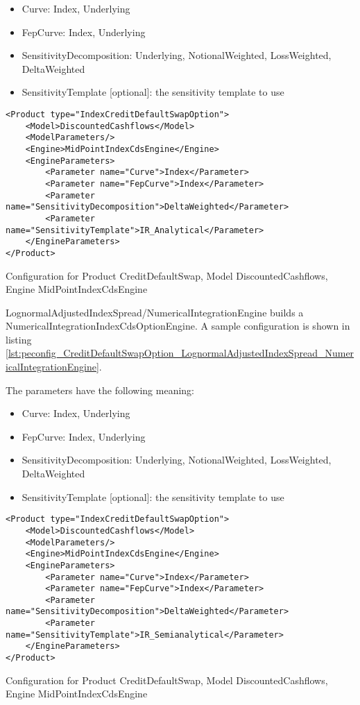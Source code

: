 \begin{itemize}
\item Curve: Index, Underlying
\item FepCurve: Index, Underlying
\item SensitivityDecomposition: Underlying, NotionalWeighted, LossWeighted, DeltaWeighted
\item SensitivityTemplate [optional]: the sensitivity template to use 
\end{itemize}

\begin{longlisting}
\begin{verbatim}
<Product type="IndexCreditDefaultSwapOption">
    <Model>DiscountedCashflows</Model>
    <ModelParameters/>
    <Engine>MidPointIndexCdsEngine</Engine>
    <EngineParameters>
        <Parameter name="Curve">Index</Parameter>
        <Parameter name="FepCurve">Index</Parameter>
        <Parameter name="SensitivityDecomposition">DeltaWeighted</Parameter>
        <Parameter name="SensitivityTemplate">IR_Analytical</Parameter>
    </EngineParameters>
</Product>
\end{verbatim}
\caption{Configuration for Product CreditDefaultSwap, Model DiscountedCashflows, Engine MidPointIndexCdsEngine}
\label{lst:peconfig_CreditDefaultSwapOption_Black_BlackIndexCdsOptionEngine}
\end{longlisting}

LognormalAdjustedIndexSpread/NumericalIntegrationEngine builds a NumericalIntegrationIndexCdsOptionEngine. A sample
configuration is shown in listing
\ref{lst:peconfig_CreditDefaultSwapOption_LognormalAdjustedIndexSpread_NumericalIntegrationEngine}.

The parameters have the following meaning:

\begin{itemize}
\item Curve: Index, Underlying
\item FepCurve: Index, Underlying
\item SensitivityDecomposition: Underlying, NotionalWeighted, LossWeighted, DeltaWeighted
\item SensitivityTemplate [optional]: the sensitivity template to use 
\end{itemize}

\begin{longlisting}
\begin{verbatim}
<Product type="IndexCreditDefaultSwapOption">
    <Model>DiscountedCashflows</Model>
    <ModelParameters/>
    <Engine>MidPointIndexCdsEngine</Engine>
    <EngineParameters>
        <Parameter name="Curve">Index</Parameter>
        <Parameter name="FepCurve">Index</Parameter>
        <Parameter name="SensitivityDecomposition">DeltaWeighted</Parameter>
        <Parameter name="SensitivityTemplate">IR_Semianalytical</Parameter>
    </EngineParameters>
</Product>
\end{verbatim}
\caption{Configuration for Product CreditDefaultSwap, Model DiscountedCashflows, Engine MidPointIndexCdsEngine}
\label{lst:peconfig_CreditDefaultSwapOption_LognormalAdjustedIndexSpread_NumericalIntegrationEngine}
\end{longlisting}

